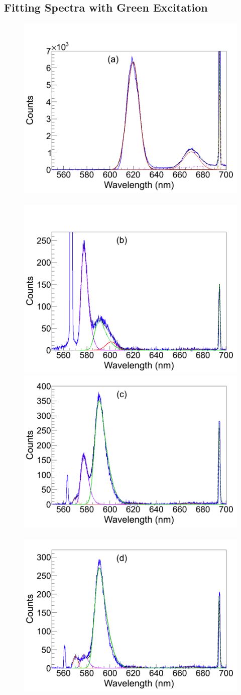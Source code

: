 \subsection{Fitting Spectra with Green Excitation}
\label{subsec:fitgrn} %

\begin{figure} %
        \centering
                \includegraphics[width=.5\textwidth]{figures/spectra_fit_a.png}
                ~
                \includegraphics[width=.5\textwidth]{figures/spectra_fit_b.png}
                \includegraphics[width=.5\textwidth]{figures/spectra_fit_c.png}
                ~
                \includegraphics[width=.5\textwidth]{figures/spectra_fit_d.png}

\end{figure}
